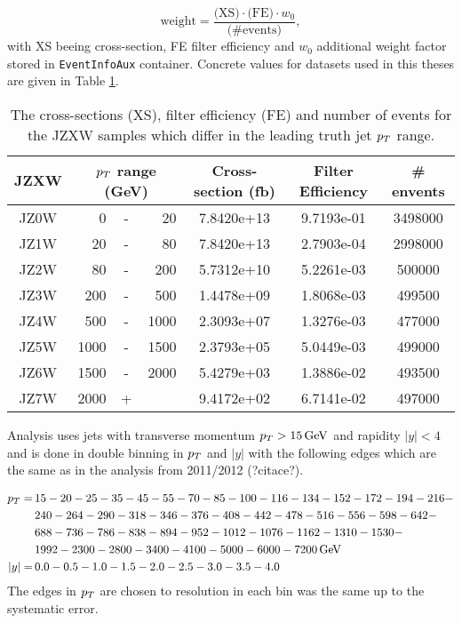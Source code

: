 \begin{equation}
  \text{weight} = \frac{\text{(XS)} \cdot \text{(FE)} \cdot w_0}{\text{(\# events)}},
\end{equation}
with XS beeing cross-section, FE filter efficiency and $w_0$ additional weight
factor stored in \texttt{EventInfoAux} container. Concrete values for datasets used in
this theses are given in Table \ref{tab:JZXW}.  

\begin{table}
  \centering
  \begin{tabular}{|c|rcr|c|c|c|}
    \hline 
     JZXW & \multicolumn{3}{|c|}{$p_{T}$ range (GeV)} & Cross-section (fb) & Filter Efficiency & \# envents  \\ 
    \hline
    \hline
		 JZ0W &     0 & - &    20 & 7.8420e+13 & 9.7193e-01 & 3498000 \\ 
    \hline
		 JZ1W &    20 & - &    80 & 7.8420e+13 & 2.7903e-04 & 2998000 \\
    \hline
		 JZ2W &    80 & - &   200 & 5.7312e+10 & 5.2261e-03 & 500000  \\
    \hline
		 JZ3W &   200 & - &   500 & 1.4478e+09 & 1.8068e-03 & 499500  \\
    \hline
		 JZ4W &   500 & - &  1000 & 2.3093e+07 & 1.3276e-03 & 477000  \\
    \hline
		 JZ5W &  1000 & - &  1500 & 2.3793e+05 & 5.0449e-03 & 499000  \\
    \hline
		 JZ6W &  1500 & - &  2000 & 5.4279e+03 & 1.3886e-02 & 493500  \\
    \hline
		 JZ7W &  2000 & + &       & 9.4172e+02 & 6.7141e-02 & 497000  \\
    \hline 
  \end{tabular}
  \caption{The cross-sections (XS), filter efficiency (FE) and number of events
  for the JZXW samples which differ in the leading truth jet $p_{T}$ range.}
  \label{tab:JZXW}
\end{table}

Analysis uses jets with transverse momentum $p_{T} > 15\,\text{GeV}$ and rapidity $|y| <
4$ and is done in double binning in $p_{T}$ and $|y|$ with the following edges
which are the same as in the analysis from 2011/2012 (?citace?).

\begin{align}
  p_{T} = \, &15-20-25-35-45-55-70-85-100-116-134-152-172-194-216- \nonumber \\
        &240-264-290-318-346-376-408-442-478-516-556-598-642- \nonumber \\
        &688-736-786-838-894-952-1012-1076-1162-1310-1530- \nonumber \\
        &1992-2300-2800-3400-4100-5000-6000-7200 \,\text{GeV} \nonumber \\
  |y| = \, &0.0-0.5-1.0-1.5-2.0-2.5-3.0-3.5-4.0
  \label{eq:Binning}
\end{align}
The edges in $p_{T}$ are chosen to resolution in each bin was the same up to the
systematic error.

